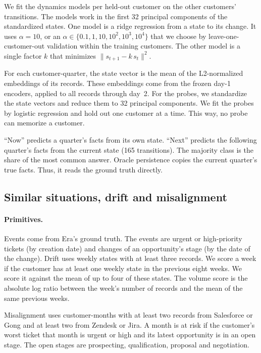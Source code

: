 \documentclass[11pt]{article}
\begin{document}
We fit the dynamics models per held-out customer on the other customers' transitions. The models work in the first 32 principal components of the standardized states. One model is a ridge regression from a state to its change. It uses $\alpha = 10$, or an $\alpha \in \{0.1, 1, 10, 10^2, 10^3, 10^4\}$ that we choose by leave-one-customer-out validation within the training customers. The other model is a single factor $k$ that minimizes $\lVert s_{t+1} - k\, s_t \rVert^2$.

For each customer-quarter, the state vector is the mean of the L2-normalized embeddings of its records. These embeddings come from the frozen day-1 encoders, applied to all records through day~2. For the probes, we standardize the state vectors and reduce them to 32 principal components. We fit the probes by logistic regression and hold out one customer at a time. This way, no probe can memorize a customer.

``Now'' predicts a quarter's facts from its own state. ``Next'' predicts the following quarter's facts from the current state (165 transitions). The majority class is the share of the most common answer. Oracle persistence copies the current quarter's true facts. Thus, it reads the ground truth directly.

\subsection{Similar situations, drift and misalignment}
\paragraph{Primitives.} Events come from Era's ground truth. The events are urgent or high-priority tickets (by creation date) and changes of an opportunity's stage (by the date of the change). Drift uses weekly states with at least three records. We score a week if the customer has at least one weekly state in the previous eight weeks. We score it against the mean of up to four of these states. The volume score is the absolute log ratio between the week's number of records and the mean of the same previous weeks.

Misalignment uses customer-months with at least two records from Salesforce or Gong and at least two from Zendesk or Jira. A month is at risk if the customer's worst ticket that month is urgent or high and its latest opportunity is in an open stage. The open stages are prospecting, qualification, proposal and negotiation.
\end{document}
